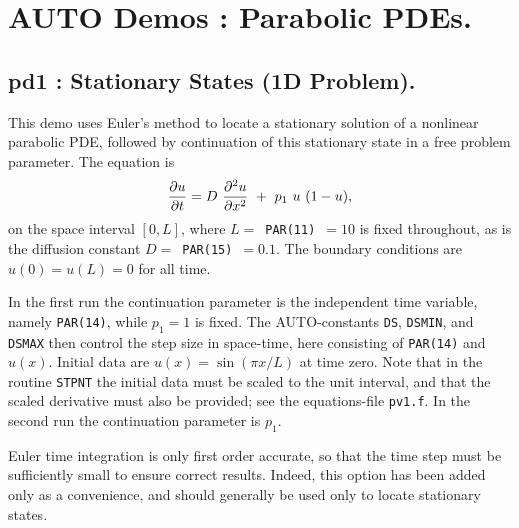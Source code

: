 \documentclass[12pt]{report}
\begin{document}
\chapter{ {\cal AUTO} Demos : Parabolic PDEs.} \label{ch:Demos_PDE}

\newpage
\section{ pd1 : Stationary States (1D Problem).} \label{sec:Demos_pd1}
This demo uses Euler's method to locate a stationary solution of
a nonlinear parabolic PDE, followed by continuation of this stationary
state in a free problem parameter. The equation is
 $$ {\partial u \over \partial t} 
  = D~{\partial^2 u \over \partial x^2} ~+~  p_1~ u ~( 1-u) , $$
on the space interval $[0,L]$, where $L=$~{\tt PAR(11)}~$=10$ is fixed throughout,
as is the diffusion constant $D=$~{\tt PAR(15)}~$=0.1$.
The boundary conditions are $u(0) = u(L) = 0$ for all time.

In the first run the continuation parameter is the independent time variable,
namely {\tt PAR(14)}, while $p_1=1$ is fixed.
The {\cal AUTO}-constants {\tt DS}, {\tt DSMIN}, and {\tt DSMAX} then control the step size
in space-time, here consisting of {\tt PAR(14)} and  $u(x)$.
Initial data are $u(x)=\sin(\pi x/L)$ at time zero.
Note that in the routine {\tt STPNT} the initial data must be scaled to 
the unit interval, and that the scaled derivative must also be provided; 
see the equations-file {\tt pv1.f}.
In the second run the continuation parameter is $p_1$.

Euler time integration is only first order accurate, so that
the time step must be sufficiently small to ensure correct results.
Indeed, this option has been added only as a convenience, and should 
generally be used only to locate stationary states.
\end{document}
